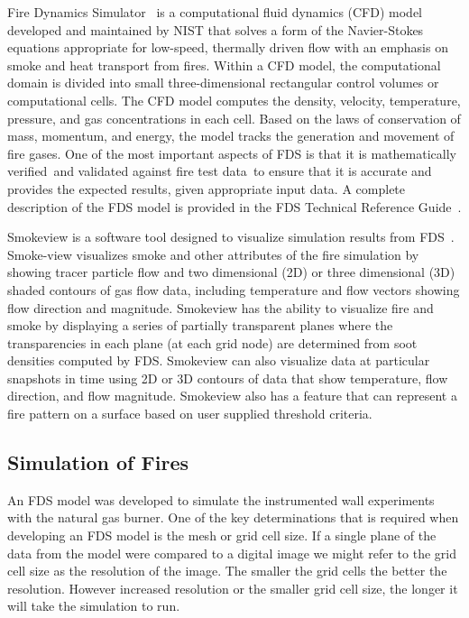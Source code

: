 \documentclass[twoside]{uocthesis}
\begin{document}
Fire Dynamics Simulator~\cite{FDS_Users_Guide} is a computational fluid dynamics (CFD) model developed and maintained by NIST that solves a form of the Navier-Stokes equations appropriate for low-speed, thermally driven flow with an emphasis on smoke and heat transport from fires. Within a CFD model, the computational domain is divided into small three-dimensional rectangular control volumes or computational cells. The CFD model computes the density, velocity, temperature, pressure, and gas concentrations in each cell. Based on the laws of conservation of mass, momentum, and energy, the model tracks the generation and movement of fire gases. One of the most important aspects of FDS is that it is mathematically verified~\cite{FDS_Verification_Guide}and validated against fire test data~\cite{FDS_Validation_Guide}to ensure that it is accurate and provides the expected results, given appropriate input data. A complete description of the FDS model is provided in the FDS Technical Reference Guide~\cite{FDS_Tech_Guide}.

Smokeview is a software tool designed to visualize simulation results from FDS~\cite{Smokeview_Users_Guide}. Smoke-view visualizes smoke and other attributes of the fire simulation by showing tracer particle flow and two dimensional (2D) or three dimensional (3D) shaded contours of gas flow data, including temperature and flow vectors showing flow direction and magnitude. Smokeview has the ability to visualize fire and smoke by displaying a series of partially transparent planes where the transparencies in each plane (at each grid node) are determined from soot densities computed by FDS. Smokeview can also visualize data at particular snapshots in time using 2D or 3D contours of data that show temperature, flow direction, and flow magnitude.  Smokeview also has a feature that can represent a fire pattern on a surface based on user supplied threshold criteria.


\subsection{Simulation of Fires}

An FDS model was developed to simulate the instrumented wall experiments with the natural gas burner.  One of the key determinations that is required when developing an FDS model is the mesh or grid cell size.  If a single plane of the data from the model were compared to a digital image we might refer to the grid cell size as the resolution of the image.  The smaller the grid cells the better the resolution. However increased resolution or the smaller grid cell size, the longer it will take the simulation to run. 
\end{document}
